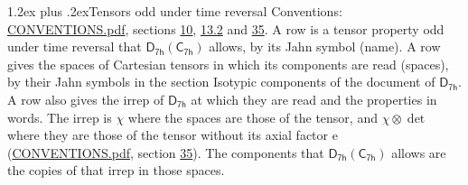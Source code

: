 \documentclass[10pt,a4paper]{article}
\makeatletter
\renewcommand\section{\@startsection{section}{1}{\z@}{-3ex plus -1ex minus -.2ex}%
  {1.2ex plus .2ex}{\normalfont\large\sffamily\bfseries\color{parttitle}}}
\numberwithin{equation}{section}
\newcommand{\grp}[1]{\mathsf{#1}}
\newcommand{\irrprod}{\otimes}
\makeatother
\begin{document}
\section{Tensors odd under time reversal}\label{s:time_odd}
Conventions: \href{../../CONVENTIONS.pdf}{CONVENTIONS.pdf}, sections \href{../../../rotation/CONVENTIONS.pdf\#conv.10}{10}, \href{../../../rotation/CONVENTIONS.pdf\#conv.13.2}{13.2} and \href{../../CONVENTIONS.pdf\#conv.35}{35}.
\leavevmode\label{n:head.name.property}A row is a tensor property odd under time reversal that $\grp{D_{7h}}(\grp{C_{7h}})$ allows, by its Jahn symbol (name). \label{n:head.spaces}A row gives the spaces of Cartesian tensors in which its components are read (spaces), by their Jahn symbols in the section Isotypic components of the document of \href{../../../rotation/data/pdf/D7h.pdf}{$\grp{D_{7h}}$}. \label{n:head.properties}A row also gives the irrep of $\grp{D_{7h}}$ at which they are read and the properties in words. The irrep is $\chi$ where the spaces are those of the tensor, and $\chi \irrprod \det$ where they are those of the tensor without its axial factor e (\href{../../CONVENTIONS.pdf}{CONVENTIONS.pdf}, section \href{../../CONVENTIONS.pdf\#conv.35}{35}). The components that $\grp{D_{7h}}(\grp{C_{7h}})$ allows are the copies of that irrep in those spaces.
\end{document}
